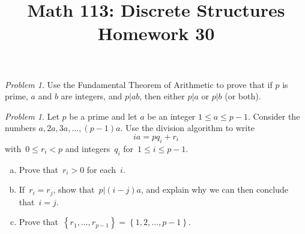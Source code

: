 \documentclass[11pt,twoside]{amsart}
\title{Math 113: Discrete Structures\\ Homework 30}
\theoremstyle{plain}
\theoremstyle{remark}
\newtheorem{prob}[prop]{Problem}
\theoremstyle{definition}
\theoremstyle{definition}
\begin{document}
\maketitle



\begin{prob}
Use the Fundamental Theorem of Arithmetic to prove that if $p$ is prime, $a$ and
$b$ are integers, and $p|ab$, then either $p|a$ or $p|b$ (or both).
\end{prob}

\begin{prob}
Let $p$ be a prime and let $a$ be an integer $1\le a\le p-1$.  Consider the
numbers $a,2a,3a,\ldots,(p-1)a$. Use the division algorithm to write
\[
ia =pq_i+r_i
\]
with~$0\leq r_i<p$ and integers~$q_i$ for~$1\leq i\leq p-1$.
\begin{enumerate}[(a)]
  \item Prove that~$r_i>0$ for each~$i$.
  \item If~$r_i=r_j$, show that~$p|(i-j)a$, and explain why we can then conclude
    that~$i=j$.
  \item Prove that~$\left\{ r_1,\dots,r_{p-1} \right\}=\left\{ 1,2,\dots,p-1\right\}$.
\end{enumerate}
\end{prob}
\end{document}

